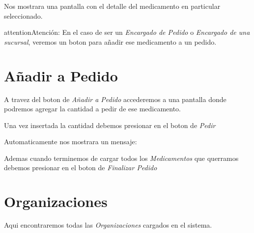 \documentclass[a4paper,10pt,spanish]{sphinxmanual}
\begin{document}
Nos mostrara una pantalla con el detalle del medicamento en particular seleccionado.


\begin{notice}{attention}{Atención:}
En el caso de ser un \emph{Encargado de Pedido} o \emph{Encargado de una sucursal}, veremos un boton para añadir ese medicamento a un pedido.
\end{notice}



\section{Añadir a Pedido}
\label{vistamovil:anadir-pedido}\label{vistamovil:anadir-a-pedido}
A travez del boton de \emph{Añadir a Pedido} accederemos a una pantalla donde podremos agregar la cantidad a pedir de ese medicamento.


Una vez insertada la cantidad debemos presionar en el boton de \emph{Pedir}


Automaticamente nos mostrara un mensaje:


Ademas cuando terminemos de cargar todos los \emph{Medicamentos} que querramos debemos presionar en el boton de \emph{Finalizar Pedido}



\section{Organizaciones}
\label{vistamovil:id2}\label{vistamovil:organizaciones}
Aqui encontraremos todas las \emph{Organizaciones} cargados en el sistema.
\end{document}
